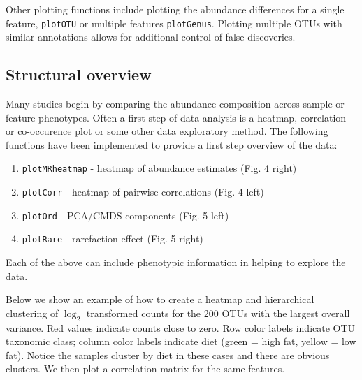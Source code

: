 \documentclass[a4paper,11pt]{article}\usepackage[]{graphicx}\usepackage[]{color}
\begin{document}
Other plotting functions include plotting the abundance
differences for a single feature, \texttt{plotOTU} or multiple features
\texttt{plotGenus}. Plotting multiple OTUs with similar annotations allows for
additional control of false discoveries.

\subsection{Structural overview}
Many studies begin by comparing the abundance composition across 
sample or feature phenotypes. Often a first step of data analysis is a 
heatmap, correlation or co-occurence plot or some other data exploratory method. 
The following functions have been implemented to provide a first step overview 
of the data:


\begin{enumerate}
\item \texttt{plotMRheatmap} - heatmap of abundance estimates (Fig. 4 right)
\item \texttt{plotCorr} - heatmap of pairwise correlations (Fig. 4 left)
\item \texttt{plotOrd} - PCA/CMDS components (Fig. 5 left)
\item \texttt{plotRare} - rarefaction effect (Fig. 5 right)
\end{enumerate}

\noindent
Each of the above can include phenotypic information in helping to explore the data.

Below we show an example of how to create a heatmap and hierarchical clustering of $\log_2$ 
transformed counts for the 200 OTUs with the largest overall variance. 
Red values indicate counts close to zero. Row color labels indicate OTU 
taxonomic class; column color labels indicate diet (green = high fat, 
yellow = low fat). Notice the samples cluster by diet in these cases 
and there are obvious clusters. We then plot a correlation matrix for the same features.
\end{document}
